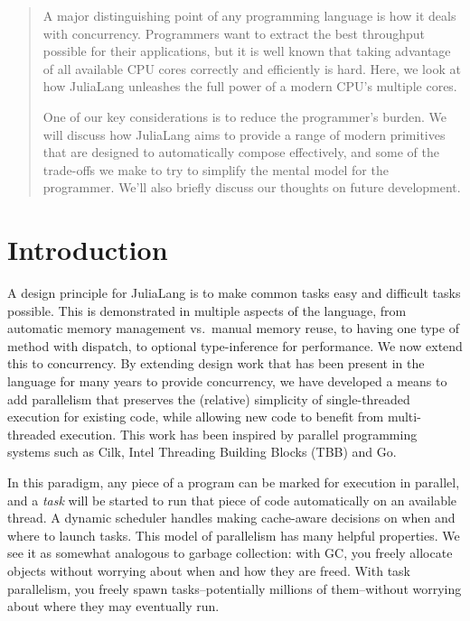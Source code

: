 \documentclass{juliacon}
\begin{document}


\maketitle

\begin{abstract}

A major distinguishing point of any programming language is how it deals with concurrency. Programmers want to extract the best throughput possible for their applications, but it is well known that taking advantage of all available CPU cores correctly and efficiently is hard. Here, we look at how JuliaLang unleashes the full power of a modern CPU's multiple cores.

One of our key considerations is to reduce the programmer's burden. We will discuss how JuliaLang aims to provide a range of modern primitives that are designed to automatically compose effectively, and some of the trade-offs we make to try to simplify the mental model for the programmer. We'll also briefly discuss our thoughts on future development.


\end{abstract}

\section{Introduction}
\label{subsub:intro}

A design principle for JuliaLang is to make common tasks easy and difficult tasks possible. This is demonstrated in multiple aspects of the language, from automatic memory management vs.\ manual memory reuse, to having one type of method with dispatch, to optional type-inference for performance. We now extend this to concurrency. By extending design work that has been present in the language for many years to provide concurrency, we have developed a means to add parallelism that preserves the (relative) simplicity of single-threaded execution for existing code, while allowing new code to benefit from multi-threaded execution. This work has been inspired by parallel programming systems such as Cilk, Intel Threading Building Blocks (TBB) and Go.

In this paradigm, any piece of a program can be marked for execution in parallel, and a \emph{task} will be started to run that piece of code automatically on an available thread. A dynamic scheduler handles making cache-aware decisions on when and where to launch tasks. This model of parallelism has many helpful properties. We see it as somewhat analogous to garbage collection: with GC, you freely allocate objects without worrying about when and how they are freed. With task parallelism, you freely spawn tasks--potentially millions of them--without worrying about where they may eventually run.
\end{document}
